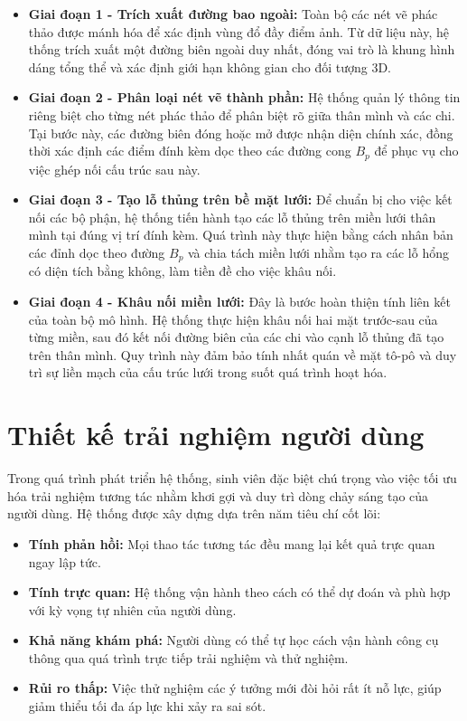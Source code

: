\documentclass{report}
\begin{document}
\begin{itemize}
    \item \textbf{Giai đoạn 1 - Trích xuất đường bao ngoài:} Toàn bộ các nét vẽ phác thảo được mánh hóa để xác định vùng đổ đầy điểm ảnh. Từ dữ liệu này, hệ thống trích xuất một đường biên ngoài duy nhất, đóng vai trò là khung hình dáng tổng thể và xác định giới hạn không gian cho đối tượng 3D.
    
    \item \textbf{Giai đoạn 2 - Phân loại nét vẽ thành phần:} Hệ thống quản lý thông tin riêng biệt cho từng nét phác thảo để phân biệt rõ giữa thân mình và các chi. Tại bước này, các đường biên đóng hoặc mở được nhận diện chính xác, đồng thời xác định các điểm đính kèm dọc theo các đường cong $B_p$ để phục vụ cho việc ghép nối cấu trúc sau này.
    
    \item \textbf{Giai đoạn 3 - Tạo lỗ thủng trên bề mặt lưới:} Để chuẩn bị cho việc kết nối các bộ phận, hệ thống tiến hành tạo các lỗ thủng trên miền lưới thân mình tại đúng vị trí đính kèm. Quá trình này thực hiện bằng cách nhân bản các đỉnh dọc theo đường $B_p$ và chia tách miền lưới nhằm tạo ra các lỗ hổng có diện tích bằng không, làm tiền đề cho việc khâu nối.
    
    \item \textbf{Giai đoạn 4 - Khâu nối miền lưới:} Đây là bước hoàn thiện tính liên kết của toàn bộ mô hình. Hệ thống thực hiện khâu nối hai mặt trước-sau của từng miền, sau đó kết nối đường biên của các chi vào cạnh lỗ thủng đã tạo trên thân mình. Quy trình này đảm bảo tính nhất quán về mặt tô-pô và duy trì sự liền mạch của cấu trúc lưới trong suốt quá trình hoạt hóa.
\end{itemize}

\section{Thiết kế trải nghiệm người dùng}
Trong quá trình phát triển hệ thống, sinh viên đặc biệt chú trọng vào việc tối ưu hóa trải nghiệm tương tác nhằm khơi gợi và duy trì dòng chảy sáng tạo của người dùng. Hệ thống được xây dựng dựa trên năm tiêu chí cốt lõi:

\begin{itemize}
    \item \textbf{Tính phản hồi:} Mọi thao tác tương tác đều mang lại kết quả trực quan ngay lập tức.
    \item \textbf{Tính trực quan:} Hệ thống vận hành theo cách có thể dự đoán và phù hợp với kỳ vọng tự nhiên của người dùng.
    \item \textbf{Khả năng khám phá:} Người dùng có thể tự học cách vận hành công cụ thông qua quá trình trực tiếp trải nghiệm và thử nghiệm.
    \item \textbf{Rủi ro thấp:} Việc thử nghiệm các ý tưởng mới đòi hỏi rất ít nỗ lực, giúp giảm thiểu tối đa áp lực khi xảy ra sai sót.
\end{itemize}
\end{document}
